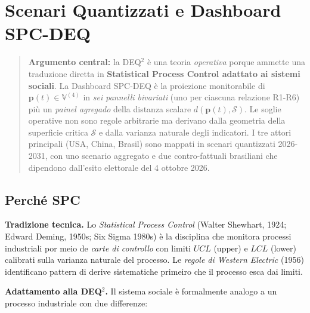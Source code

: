 \chapter{Scenari Quantizzati e Dashboard
SPC-DEQ}\label{scenari-quantizzati-e-dashboard-spc-deq}

\begin{quote}
\textbf{Argumento central:} la DEQ$^2$ è una teoria \emph{operativa}
porque ammette una traduzione diretta in \textbf{Statistical Process
Control adattato ai sistemi sociali}. La Dashboard SPC-DEQ è la
proiezione monitorabile di \(\boldsymbol{p}(t) \in \mathbb{V}^{(4)}\) in
\emph{sei pannelli bivariati} (uno per ciascuna relazione R1-R6) più un
\emph{painel agregado} della distanza scalare
\(d(\boldsymbol{p}(t), \mathcal{S})\). Le soglie operative non sono
regole arbitrarie ma derivano dalla geometria della superficie critica
\(\mathcal{S}\) e dalla varianza naturale degli indicatori. I tre attori
principali (USA, China, Brasil) sono mappati in scenari quantizzati
2026-2031, con uno scenario aggregato e due contro-fattuali brasiliani
che dipendono dall'esito elettorale del 4 ottobre 2026.
\end{quote}



\section{Perché SPC}\label{perchuxe9-spc}

\Hypoth{} \textbf{Tradizione tecnica.} Lo \emph{Statistical Process
Control} (Walter Shewhart, 1924; Edward Deming, 1950s; Six Sigma 1980s)
è la disciplina che monitora processi industriali por meio de \emph{carte di
controllo} con limiti \(UCL\) (upper) e \(LCL\) (lower) calibrati sulla
varianza naturale del processo. Le \emph{regole di Western Electric}
(1956) identificano pattern di derive sistematiche primeiro che il processo
esca dai limiti.

\Hypoth{} \textbf{Adattamento alla DEQ$^2$.} Il sistema sociale è
formalmente analogo a un processo industriale con due differenze:

